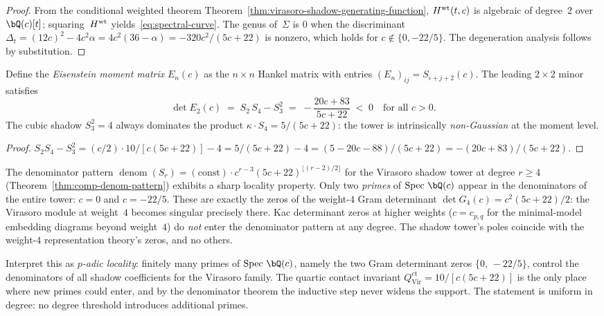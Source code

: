 \begin{proof}
From the conditional weighted theorem
Theorem~\ref{thm:virasoro-shadow-generating-function},
$H^{\rm wt}(t,c)$ is algebraic of degree~$2$ over $\bQ(c)[t]$;
squaring~$H^{\rm wt}$ yields~\eqref{eq:spectral-curve}. The genus
of~$\Sigma$ is $0$ when the discriminant
$\Delta_t = (12c)^2 - 4c^2\alpha = 4c^2(36-\alpha) =
-320c^2/(5c+22)$ is nonzero, which holds for
$c \notin \{0, -22/5\}$. The degeneration analysis follows by
substitution.
\end{proof}

\begin{proposition}
\label{prop:moment-matrix-negativity}
\ClaimStatusProvedHere
{}
Define the \emph{Eisenstein moment matrix} $E_n(c)$ as the $n \times n$ Hankel matrix with entries $(E_n)_{ij} = S_{i+j+2}(c)$. The leading $2 \times 2$ minor satisfies
\[
 \det E_2(c)
 \;=\;
 S_2\,S_4 - S_3^2
 \;=\;
 -\frac{20c + 83}{5c + 22}
 \;<\; 0
 \quad\text{for all $c > 0$.}
\]
The cubic shadow $S_3^2 = 4$ always dominates the product $\kappa \cdot S_4 = 5/(5c{+}22)$: the tower is intrinsically \emph{non-Gaussian} at the moment level.
\end{proposition}

\begin{proof}
$S_2 S_4 - S_3^2 = (c/2) \cdot 10/[c(5c{+}22)] - 4 = 5/(5c{+}22) - 4 = (5 - 20c - 88)/(5c{+}22) = -(20c + 83)/(5c{+}22)$.
\end{proof}

\begin{remark}
\label{rem:shadow-p-adic-locality}
The denominator pattern
$\operatorname{denom}(S_r) = (\text{const}) \cdot
c^{r-3}(5c{+}22)^{\lfloor(r-2)/2\rfloor}$
for the Virasoro shadow tower at degree $r \geq 4$
\textup{(}Theorem~\textup{\ref{thm:comp-denom-pattern}}\textup{)}
exhibits a sharp locality property. Only two \emph{primes} of
$\operatorname{Spec}\,\bQ(c)$ appear in the denominators of
the entire tower: $c = 0$ and $c = -22/5$. These are exactly
the zeros of the weight-$4$ Gram determinant
$\det G_4(c) = c^2(5c{+}22)/2$: the Virasoro module at weight~$4$
becomes singular precisely there. Kac determinant zeros at
higher weights \textup{(}$c = c_{p,q}$ for the minimal-model
embedding diagrams beyond weight~$4$\textup{)} do \emph{not}
enter the denominator pattern at any degree. The shadow tower's
poles coincide with the weight-$4$ representation theory's zeros,
and no others.

Interpret this as \emph{$p$-adic locality}: finitely many
primes of $\operatorname{Spec}\,\bQ(c)$, namely the two Gram
determinant zeros $\{0,\,-22/5\}$, control the denominators
of all shadow coefficients for the Virasoro family. The
quartic contact invariant
$Q^{\mathrm{ct}}_{\mathrm{Vir}} = 10/[c(5c{+}22)]$
is the only place where new primes could enter, and by the
denominator theorem the inductive step never widens the
support. The statement is uniform in degree: no degree threshold
introduces additional primes.
\end{remark}

